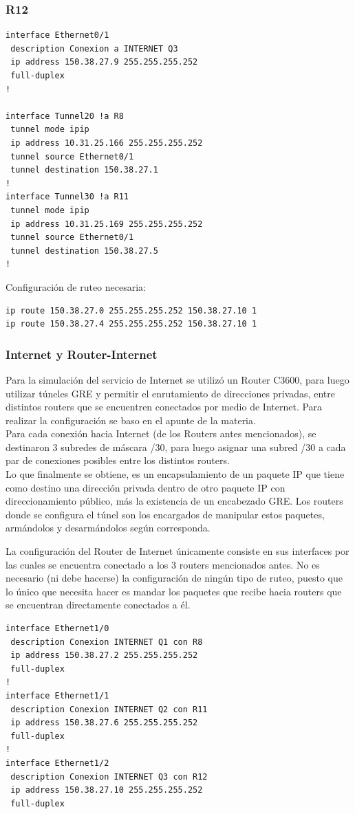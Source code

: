 \subsubsection{R12}
\begin{verbatim}
interface Ethernet0/1
 description Conexion a INTERNET Q3
 ip address 150.38.27.9 255.255.255.252
 full-duplex
!

interface Tunnel20 !a R8
 tunnel mode ipip
 ip address 10.31.25.166 255.255.255.252
 tunnel source Ethernet0/1
 tunnel destination 150.38.27.1
!
interface Tunnel30 !a R11
 tunnel mode ipip
 ip address 10.31.25.169 255.255.255.252
 tunnel source Ethernet0/1
 tunnel destination 150.38.27.5
!
\end{verbatim}
Configuración de ruteo necesaria:
\begin{verbatim}
ip route 150.38.27.0 255.255.255.252 150.38.27.10 1
ip route 150.38.27.4 255.255.255.252 150.38.27.10 1
\end{verbatim}

\subsubsection{Internet y Router-Internet}
Para la simulación del servicio de Internet se utilizó un Router C3600, para luego utilizar túneles GRE y permitir el enrutamiento de direcciones privadas, entre distintos routers que se encuentren conectados por medio de Internet. Para realizar la configuración se baso en el apunte de la materia.\\
Para cada conexión hacia Internet (de los Routers antes mencionados), se destinaron 3 subredes de máscara /30, para luego asignar una subred /30 a cada par de conexiones posibles entre los distintos routers.\\
Lo que finalmente se obtiene, es un encapsulamiento de un paquete IP que tiene como destino una dirección privada dentro de otro paquete IP con direccionamiento público, más la existencia de un encabezado GRE. Los routers donde se configura el túnel son los encargados de manipular estos paquetes, armándolos y desarmándolos según corresponda.

La configuración del Router de Internet únicamente consiste en sus interfaces por las cuales se encuentra conectado a los 3 routers mencionados antes. No es necesario (ni debe hacerse) la configuración de ningún tipo de ruteo, puesto que lo único que necesita hacer es mandar los paquetes que recibe hacia routers que se encuentran directamente conectados a él.
\begin{verbatim}
interface Ethernet1/0
 description Conexion INTERNET Q1 con R8
 ip address 150.38.27.2 255.255.255.252
 full-duplex
!
interface Ethernet1/1
 description Conexion INTERNET Q2 con R11
 ip address 150.38.27.6 255.255.255.252
 full-duplex
!
interface Ethernet1/2
 description Conexion INTERNET Q3 con R12
 ip address 150.38.27.10 255.255.255.252
 full-duplex
\end{verbatim}


